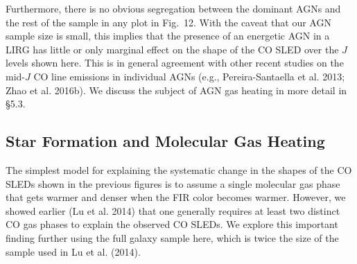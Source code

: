 \documentclass[preprint]{aastex}
\begin{document}
Furthermore, there is no obvious segregation between the dominant AGNs and the rest 
of the sample in any plot in Fig.~12.  With the caveat that our AGN sample
size is  small, this implies that the presence of an energetic AGN in a LIRG 
has little or only marginal effect on the shape of the CO SLED over the $J$ levels 
shown here.  This is in general agreement with other recent studies on the mid-$J$
CO line emissions in individual AGNs (e.g., Pereira-Santaella et al. 2013; Zhao 
et al. 2016b). We discuss the subject of AGN gas heating in more detail in \S5.3.




\subsection{Star Formation and Molecular Gas Heating} \label{sec5.2}

The simplest model for explaining the systematic change in the shapes of the CO 
SLEDs shown in the previous figures is to assume a single molecular gas phase 
that gets warmer and denser when the FIR color becomes warmer. However, we showed
earlier (Lu et al. 2014) that one generally requires at least two distinct CO 
gas phases to explain the observed CO SLEDs. We explore this important finding
further using the full galaxy sample here, which is twice the size of the sample
used in Lu et al. (2014).
\end{document}
